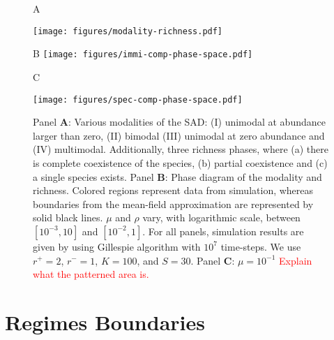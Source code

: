 \documentclass[9pt,lineno]{elife}
\begin{document}
\begin{figure*}[h!]
   \begin{flushleft}
        A
   \end{flushleft}
    \texttt{[image: figures/modality-richness.pdf]}
    \begin{minipage}{.45\linewidth}
    \begin{flushleft}
        B
    \texttt{[image: figures/immi-comp-phase-space.pdf]}
    \end{flushleft}
  \end{minipage}
  \hfill
  \begin{minipage}{.45\linewidth}
    \begin{flushright}
        \begin{flushleft}
            C
        \end{flushleft}
    \texttt{[image: figures/spec-comp-phase-space.pdf]}
    \end{flushright} 
  \end{minipage}
    \caption{Panel \textbf{A}: Various modalities of the SAD: (I) unimodal at abundance larger than zero, (II) bimodal (III) unimodal at zero abundance and (IV) multimodal. Additionally, three richness phases, where (a) there is complete coexistence of the species, (b) partial coexistence and (c) a single species exists. Panel \textbf{B}: Phase diagram of the modality and richness. Colored regions represent data from simulation, whereas boundaries from the mean-field approximation are represented by solid black lines. $\mu$ and $\rho$ vary, with logarithmic scale, between $[10^{-3}, 10]$ and $[10^{-2}, 1]$. For all panels, simulation results are given by using Gillespie algorithm with $10^7$ time-steps. We use $r^+=2$, $r^-=1$,  $K=100$,  and $S=30$. Panel \textbf{C}: $\mu=10^{-1}$ \textcolor{red}{Explain what the patterned area is.} }
    \label{fig:phases_sim}
\end{figure*}
    
\section{Regimes Boundaries}
\label{sec:Phase_transition}
\end{document}
